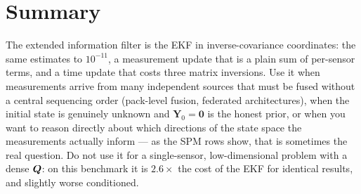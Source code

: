 \section{Summary}
The extended information filter is the EKF in inverse-covariance coordinates: the same estimates
to $10^{-11}$, a measurement update that is a plain sum of per-sensor terms, and a time update
that costs three matrix inversions. Use it when measurements arrive from many independent
sources that must be fused without a central sequencing order (pack-level fusion, federated
architectures), when the initial state is genuinely unknown and $\bm{Y}_0 = \bm0$ is the honest
prior, or when you want to reason directly about which directions of the state space the
measurements actually inform --- as the SPM rows show, that is sometimes the real question. Do
not use it for a single-sensor, low-dimensional problem with a dense $\bm{Q}$: on this benchmark it
is $2.6\times$ the cost of the EKF for identical results, and slightly worse conditioned.
